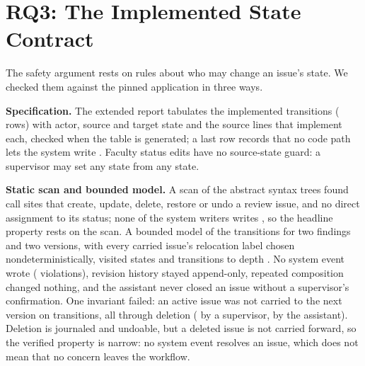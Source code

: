 \section{RQ3: The Implemented State Contract}\label{sec:statecheck}
The safety argument rests on rules about who may change an issue's state. We checked them against the pinned application in three ways.

\textbf{Specification.} The extended report tabulates the implemented transitions (\wpdTransitionRows{} rows) with actor, source and target state and the source lines that implement each, checked when the table is generated; a last row records that no code path lets the system write . Faculty status edits have no source-state guard: a supervisor may set any state from any state.

\textbf{Static scan and bounded model.} A scan of the abstract syntax trees found \wpdWriters{} call sites that create, update, delete, restore or undo a review issue, and no direct assignment to its status; none of the system writers writes , so the headline property rests on the scan. A bounded model of the transitions for two findings and two versions, with every carried issue's relocation label chosen nondeterministically, visited \wpdStates{} states and \wpdTransitions{} transitions to depth \wpdDepth. No system event wrote  (\wpdSystemResolved{} violations), revision history stayed append-only, repeated composition changed nothing, and the assistant never closed an issue without a supervisor's confirmation. One invariant failed: an active issue was not carried to the next version on \wpdNotCarried{} transitions, all through deletion (\wpdNotCarriedFaculty{} by a supervisor, \wpdNotCarriedAgent{} by the assistant). Deletion is journaled and undoable, but a deleted issue is not carried forward, so the verified property is narrow: no system event resolves an issue, which does not mean that no concern leaves the workflow.

